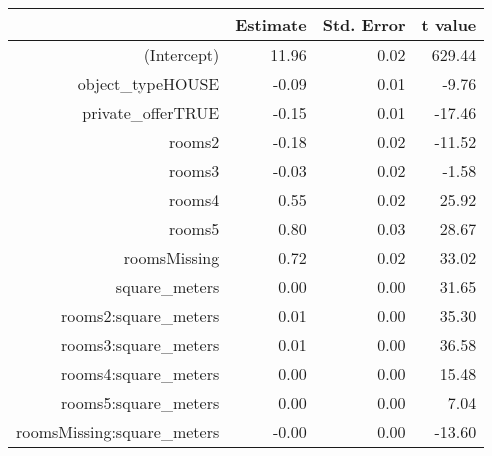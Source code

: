 \begin{table}[ht]
\centering
\begin{tabular}{rrrr}
  \hline
 & Estimate & Std. Error & t value \\ 
  \hline
(Intercept) & 11.96 & 0.02 & 629.44 \\ 
  object\_typeHOUSE & -0.09 & 0.01 & -9.76 \\ 
  private\_offerTRUE & -0.15 & 0.01 & -17.46 \\ 
  rooms2 & -0.18 & 0.02 & -11.52 \\ 
  rooms3 & -0.03 & 0.02 & -1.58 \\ 
  rooms4 & 0.55 & 0.02 & 25.92 \\ 
  rooms5 & 0.80 & 0.03 & 28.67 \\ 
  roomsMissing & 0.72 & 0.02 & 33.02 \\ 
  square\_meters & 0.00 & 0.00 & 31.65 \\ 
  rooms2:square\_meters & 0.01 & 0.00 & 35.30 \\ 
  rooms3:square\_meters & 0.01 & 0.00 & 36.58 \\ 
  rooms4:square\_meters & 0.00 & 0.00 & 15.48 \\ 
  rooms5:square\_meters & 0.00 & 0.00 & 7.04 \\ 
  roomsMissing:square\_meters & -0.00 & 0.00 & -13.60 \\ 
   \hline
\end{tabular}
\end{table}
